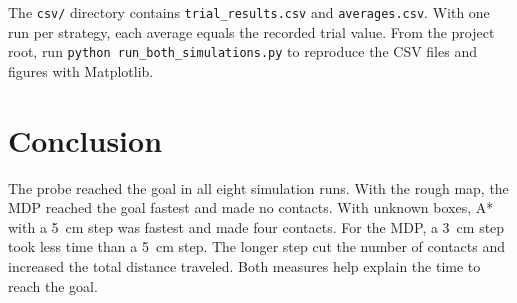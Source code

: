 \documentclass[letterpaper,journal]{IEEEtran}
\begin{document}
The \texttt{csv/} directory contains \texttt{trial\_results.csv} and \texttt{averages.csv}. With one run per strategy, each average equals the recorded trial value. From the project root, run \texttt{python run\_both\_simulations.py} to reproduce the CSV files and figures with Matplotlib.

\section{Conclusion}

The probe reached the goal in all eight simulation runs. With the rough map, the MDP reached the goal fastest and made no contacts. With unknown boxes, A* with a 5~cm step was fastest and made four contacts. For the MDP, a 3~cm step took less time than a 5~cm step. The longer step cut the number of contacts and increased the total distance traveled. Both measures help explain the time to reach the goal.



\end{document}
